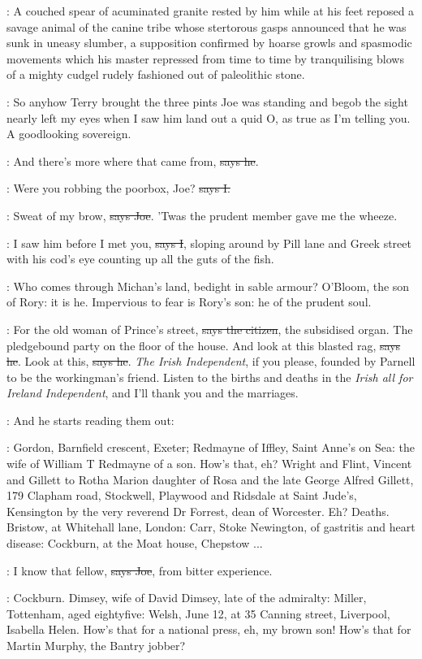 :
A couched spear of acuminated granite rested by him while at his feet
reposed a savage animal of the canine tribe whose stertorous gasps
announced that he was sunk in uneasy slumber, a supposition confirmed by
hoarse growls and spasmodic movements which his master repressed from time
to time by tranquilising blows of a mighty cudgel rudely fashioned out of
paleolithic stone.

\Nq:
So anyhow Terry brought the three pints Joe was standing and begob
the sight nearly left my eyes when I saw him land out a quid O, as true as
I'm telling you. A goodlooking sovereign.

\joe:
And there's more where that came from, \sout{says he}.

:
Were you robbing the poorbox, Joe? \sout{says I.}

\joe:
Sweat of my brow, \sout{says Joe}.
'Twas the prudent member gave me the wheeze.

:
I saw him before I met you, \sout{says I},
sloping around by Pill lane and
Greek street with his cod's eye counting up all the guts of the fish.

:
Who comes through Michan's land, bedight in sable armour? O'Bloom,
the son of Rory: it is he. Impervious to fear is Rory's son: he
of the prudent soul.

\citizen:
For the old woman of Prince's street,
\sout{says the citizen}, the subsidised
organ. The pledgebound party on the floor of the house. And look at this
blasted rag, \sout{says he}. Look at this, \sout{says he}.
\emph{The Irish Independent}, if you
please, founded by Parnell to be the workingman's friend. Listen to the
births and deaths in the \emph{Irish all for Ireland Independent}, and I'll thank
you and the marriages.

\Nq:
And he starts reading them out:

\citizen:
Gordon, Barnfield crescent, Exeter;
Redmayne of Iffley, Saint Anne's on
Sea: the wife of William T Redmayne of a son. How's that, eh? Wright and
Flint, Vincent and Gillett to Rotha Marion daughter of Rosa and the late
George Alfred Gillett, 179 Clapham road, Stockwell, Playwood and
Ridsdale at Saint Jude's, Kensington by the very reverend Dr Forrest, dean
of Worcester. Eh? Deaths. Bristow, at Whitehall lane, London: Carr, Stoke
Newington, of gastritis and heart disease: Cockburn, at the Moat house,
Chepstow ...

\joe:
I know that fellow, \sout{says Joe},
from bitter experience.

\citizen:
Cockburn. Dimsey, wife of David Dimsey,
late of the admiralty: Miller,
Tottenham, aged eightyfive: Welsh, June 12, at 35 Canning street,
Liverpool, Isabella Helen. How's that for a national press, eh, my brown
son! How's that for Martin Murphy, the Bantry jobber?

